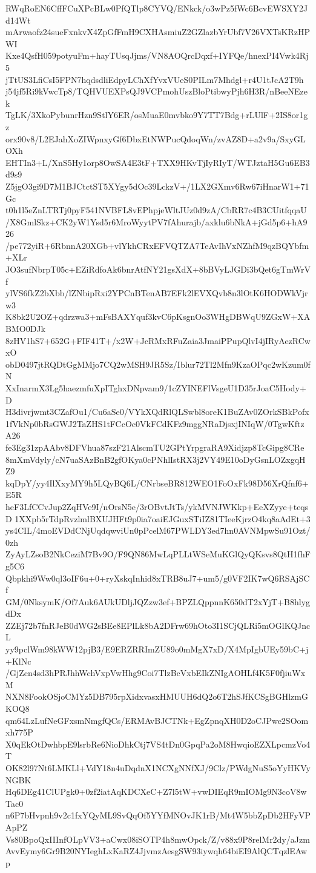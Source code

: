 RWqRoEN6CffFCuXPcBLw0PfQTlp8CYVQ/ENkck/o3wPz5fWc6BcvEWSXY2Jd14Wt
mArwaofz24sueFxnkvX4ZpGfFmH9CXHAsmiuZ2GZlazbYrUbf7V26VXTsKRzHPWI
Kxe4QsfH059potyuFm+hayTUsqJjms/VN8AOQrcDqxf+IYFQe/hnexPI4Vwk4Rj5
jTtUS3LfiCsI5FPN7hqdsdliEdpyLChXfYvxVUeS0PILm7Mhdgl+r4U1tJcA2T9h
j54jf5Ri9kVwcTp8/TQHVUEXPsQJ9VCPmohUszBloPtibwyPjh6H3R/nBeeNEzek
TgLK/3XkoPybunrHzn9StlY6ER/osMuaE0mvbko9Y7TT7Bdg+rLUlF+2IS8or1gz
orx90v8/L2EJahXoZIWpnxyGf6DbxEtNWPucQdoqWn/zvAZ8D+a2v9a/SxyGLOXh
EHTIn3+L/XnS5Hy1orp8OwSA4E3tF+TXX9HKvTjIyRIyT/WTJztaH5Gu6EB3d9s9
Z5jgO3gi9D7M1BJCtctST5XYgy5dOc39LckzV+/1LX2GXmv6Rw67iHnarW1+71Gc
t0h1l5eZnLTRTj0pyF541NVBFL8vEPhpjeWltJUz0d9zA/CbRR7c4B3CUitfqqaU
/X8GmlSkz+CK2yW1Ysd5r6MroWyytPV7fAhurajb/axklu6bNkA+jGd5p6+hA926
/pe772yiR+6RbnnA20XGb+vlYkhCRxEFVQTZA7TeAvIhVxNZhfM9qzBQYbfm+XLr
JO3sufNbrpT05c+EZiRdfoAk6bnrAtfNY21gsXdX+8bBVyLJGDi3bQet6gTmWrVf
ylVS6fkZ2bXbb/lZNbipRxi2YPCnBTenAB7EFk2lEVXQvb8n3lOtK6HODWkVjrw3
K8bk2U2OZ+qdrzwa3+mFsBAXYquf3kvC6pKsgnOo3WHgDBWqU9ZGxW+XABMO0DJk
8zHV1hS7+652G+FIF41T+/x2W+JcRMxRFuZaia3JmaiPPupQlvI4jIRyAezRCwxO
obD0497jtRQDtGgMMjo7CQ2wMSH9JR5Sz/Iblur72Tl2Mfn9KzaOPqc2wKzum0fN
XxInarmX3Lg5haezmfuXpITghxDNpvam9/1cZYINEFlVsgeU1D35rJoaC5Hody+D
H3divrjwmt3CZafOu1/Cu6aSe0/VYkXQdRlQLSwbl8oreK1BuZAv0ZOrkSBkPofx
1fVkNp0bRsGWJ2TaZHS1tFCcOc0VkFCdKFz9mggNRaDjsxjINIqW/0TgwKftzA26
fe3Eg31zpAAbv8DFVhua87szF21AlscmTU2GPtYrpgraRA9Xidjzp8TcGipg8CRe
8mXmVdyly/cN7uaSAzBnB2gfOKya0cPNhlIstRX3j2VY49E10oDyGsnLOZxgqHZ9
kqDpY/yy4IlXxyMY9h5LQyBQ6L/CNrbseBR812WEO1FoOxFk98D56XrQfnf6+E5R
heF3LfCCvJup2ZqHVe9I/nOrsN5e/3rOBvtJtTs/ykMVNJWKkp+EeXZyye+teqsD
1XXpb5rTdpRvzlmlBXUJHFt9p0ia7oaiEJGuxSTiIZ81TIeeKjrzO4kq8aAdEt+3
ys4CIL/4moEVDdCNjUqdqwviUn0pPcelM67PWLDY3ed7hn0AVNMpwSu91Ozt/0zh
ZyAyLZsoB2NkCeziM7Bv9O/F9QN86MwLqPLLtWSeMuKGlQyQKsvs8QtH1fhFg5C6
Qbpkhi9Ww0ql3oIF6u+0+ryXskqInhid8xTRB8uJ7+um5/g0VF2IK7wQ6RSAjSCf
GM/0NksymK/Of7Auk6AUkUDljJQZzw3ef+BPZLQppnnK650dT2xYjT+B8hlygdDx
ZZEj72b7fnRJeB0dWG2sBEe8EPlLk8bA2DFrw69hOto3I1SCjQLRi5mOGlKQJncL
yy9pclWm98kWW12pjB3/E9ERZRRImZU89o0mMgX7xD/X4MpIgbUEy59bC+j+KlNc
/GjZcn4sd3hPRJhhWchVxpVwHhg9Coi7TlzBcVxbEIkZNIgAOHLf4K5F0fjiuWxM
NXN8FookOSjoCMYz5DB795rpXidxvasxHMUUH6dQ2o6T2hSJfKCSgBGHlzmGKOQ8
qm64LzLufNeGFxsmNmgfQCs/ERMAvBJCTNk+EgZpnqXH0D2oCJPwe2SOomxh775P
X0qEkOtDwhbpE9lsrbRe6NioDhkCtj7VS4tDn0GpqPa2oM8HwqioEZXLpcmzVo4T
OK82l97Nt6LMKLl+VdY18n4uDqdnX1NCXgNNfXJ/9Clz/PWdgNuS5oYyHKVyNGBK
Hq6DEg41ClUPgk0+0zf2iatAqKDCXeC+Z7l5tW+vwDIEqR9mIOMg9N3coV8wTac0
n6P7bHvpnh9v2c1fxYQyML9SvQqOf5YYfMNOvJK1rB/Mt4W5bbZpDb2HFyVPApPZ
Vs80BpoQxIIInfOLpVV3+aCwx08iSOTP4h8mwOpck/Z/v88x9P8relMr2dy/aJzm
AvvEymy6Gr9B20NYIeghLxKaRZ4JjvmzAesgSW93iywqh64biEI9AlQCTqzlEAwp
